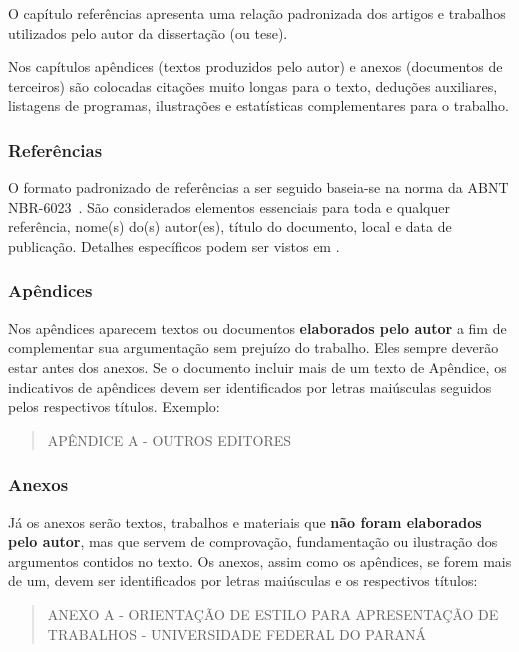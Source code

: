 \documentclass[repeatfields,xlists,xpacks,oneside,yearsonly]{ufrgscca}
\begin{document}
O capítulo referências apresenta uma relação padronizada dos artigos e
trabalhos utilizados pelo autor da dissertação (ou tese).

Nos capítulos apêndices (textos produzidos pelo autor) e anexos (documentos
de terceiros) são colocadas citações muito longas para o texto, deduções
auxiliares, listagens de programas, ilustrações e estatísticas
complementares para o trabalho.

\subsubsection{Referências}
O formato padronizado de referências a ser seguido baseia-se na norma da ABNT
NBR-6023~\cite{ABNT:NBR-6023-2002}. São considerados
elementos essenciais para toda e qualquer referência, nome(s) do(s)
autor(es), título do documento, local e data de publicação. Detalhes específicos podem ser vistos em .


\subsubsection{Apêndices}

Nos apêndices aparecem textos ou documentos {\bf elaborados pelo autor}  a
fim de complementar sua argumentação sem prejuízo do trabalho. Eles sempre
deverão estar antes dos anexos. Se o documento incluir mais de um texto de
Apêndice, os indicativos de apêndices devem ser identificados por letras
maiúsculas seguidos pelos respectivos títulos. Exemplo:\\

\begin{quote}APÊNDICE A  - OUTROS EDITORES\\\end{quote}

\subsubsection{Anexos}

Já os anexos serão textos, trabalhos e materiais que {\bf não foram
elaborados pelo autor}, mas que servem de comprovação, fundamentação ou
ilustração dos argumentos contidos no texto. Os anexos, assim como os
apêndices, se forem mais de um, devem ser identificados por letras
maiúsculas e os respectivos títulos:\\

\begin{quote}ANEXO A - ORIENTAÇÃO DE ESTILO PARA APRESENTAÇÃO DE TRABALHOS - UNIVERSIDADE FEDERAL DO PARANÁ\\\end{quote}
\end{document}
